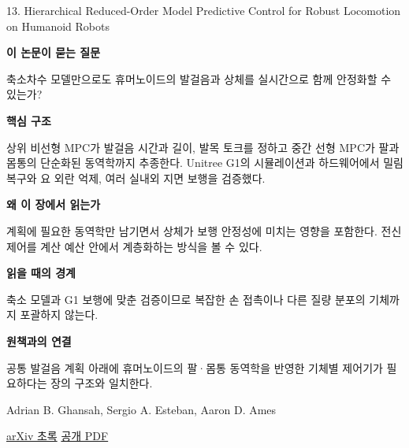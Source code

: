 \documentclass[11pt,openany]{book}
\begin{document}
\begin{termcard}{13. Hierarchical Reduced-Order Model Predictive Control for Robust Locomotion on Humanoid Robots}

\par

\medskip

{\sffamily\bfseries\color{deepblue} 이 논문이 묻는 질문}\par

축소차수 모델만으로도 휴머노이드의 발걸음과 상체를 실시간으로 함께 안정화할 수 있는가?

\smallskip

{\sffamily\bfseries\color{deepblue} 핵심 구조}\par

상위 비선형 MPC가 발걸음 시간과 길이, 발목 토크를 정하고 중간 선형 MPC가 팔과 몸통의 단순화된 동역학까지 추종한다. Unitree G1의 시뮬레이션과 하드웨어에서 밀림 복구와 요 외란 억제, 여러 실내외 지면 보행을 검증했다.

\smallskip

{\sffamily\bfseries\color{deepblue} 왜 이 장에서 읽는가}\par

계획에 필요한 동역학만 남기면서 상체가 보행 안정성에 미치는 영향을 포함한다. 전신 제어를 계산 예산 안에서 계층화하는 방식을 볼 수 있다.

\smallskip

{\sffamily\bfseries\color{coral} 읽을 때의 경계}\par

축소 모델과 G1 보행에 맞춘 검증이므로 복잡한 손 접촉이나 다른 질량 분포의 기체까지 포괄하지 않는다.

\smallskip

{\sffamily\bfseries\color{teal} 원책과의 연결}\par

공통 발걸음 계획 아래에 휴머노이드의 팔·몸통 동역학을 반영한 기체별 제어기가 필요하다는 장의 구조와 일치한다.

\medskip

{\footnotesize\color{muted} Adrian B. Ghansah, Sergio A. Esteban, Aaron D. Ames\par

\href{https://arxiv.org/abs/2509.04722}{arXiv 초록} \quad \href{https://arxiv.org/pdf/2509.04722}{공개 PDF}\par}

\end{termcard}
\end{document}
